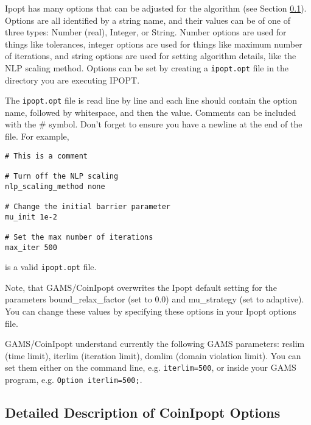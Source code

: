 Ipopt has many options that can be adjusted for the algorithm (see Section \ref{sub:ipoptoptions}).
Options are all identified by a string name, and their values can be of one of three types: Number (real), Integer, or String.
Number options are used for things like tolerances, integer options are used for things like maximum number of iterations, and string options are used for setting algorithm details, like the NLP scaling method.
Options can be set by creating a \texttt{ipopt.opt} file in the directory you are executing IPOPT.

The \texttt{ipopt.opt} file is read line by line and each line should contain the option name, followed by whitespace, and then the value.
Comments can be included with the \# symbol. Don't forget to ensure you have a newline at the end of the file. For example,
\begin{verbatim}
# This is a comment

# Turn off the NLP scaling
nlp_scaling_method none

# Change the initial barrier parameter
mu_init 1e-2

# Set the max number of iterations
max_iter 500
\end{verbatim}
is a valid \texttt{ipopt.opt} file.


Note, that GAMS/CoinIpopt overwrites the Ipopt default setting for the parameters bound\_relax\_factor (set to 0.0) and mu\_strategy (set to adaptive).
You can change these values by specifying these options in your Ipopt options file.

GAMS/CoinIpopt understand currently the following GAMS parameters: reslim (time limit), iterlim (iteration limit), domlim (domain violation limit).
You can set them either on the command line, e.g. \verb+iterlim=500+, or inside your GAMS program, e.g. \verb+Option iterlim=500;+.

\subsection{Detailed Description of CoinIpopt Options}
\label{sub:ipoptoptions}


\chapterend

